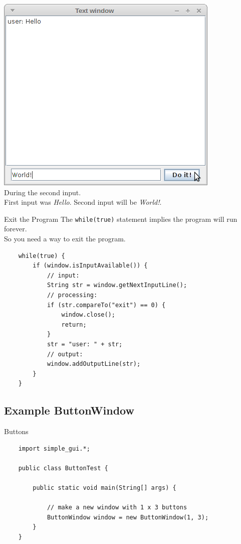 \begin{frame}{}
	\includegraphics[scale=0.4]{res/gui_input.png}\\
	\footnotesize{During the second input. \\First input was \emph{Hello}. Second input will be \emph{World!}.}
\end{frame}

\begin{frame}[fragile]{Exit the Program}
	The \texttt{while(true)} statement implies the program will run forever. \\
	So you need a way to exit the program.
	\begin{lstlisting}
	while(true) {
	    if (window.isInputAvailable()) {
	        // input:
	        String str = window.getNextInputLine();
	        // processing:
	        if (str.compareTo("exit") == 0) {
	            window.close();
	            return;
	        }
	        str = "user: " + str;
	        // output:
	        window.addOutputLine(str);
	    }	    
	}
	\end{lstlisting}
\end{frame}

\subsection{Example ButtonWindow}
\begin{frame}[fragile]{Buttons}
	\begin{lstlisting}
	import simple_gui.*;

	public class ButtonTest {

	    public static void main(String[] args) {
		
	        // make a new window with 1 x 3 buttons
	        ButtonWindow window = new ButtonWindow(1, 3);
	    }
	}	
	\end{lstlisting}
\end{frame}

